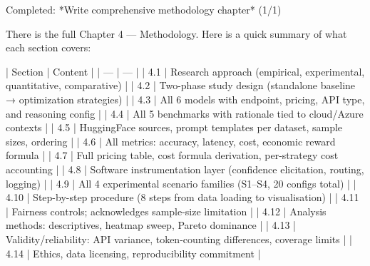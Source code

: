 Completed: *Write comprehensive methodology chapter* (1/1)

There is the full Chapter 4 — Methodology. Here is a quick summary of what each section covers:

| Section | Content |
| --- | --- |
| 4.1 | Research approach (empirical, experimental, quantitative, comparative) |
| 4.2 | Two-phase study design (standalone baseline → optimization strategies) |
| 4.3 | All 6 models with endpoint, pricing, API type, and reasoning config |
| 4.4 | All 5 benchmarks with rationale tied to cloud/Azure contexts |
| 4.5 | HuggingFace sources, prompt templates per dataset, sample sizes, ordering |
| 4.6 | All metrics: accuracy, latency, cost, economic reward formula |
| 4.7 | Full pricing table, cost formula derivation, per-strategy cost accounting |
| 4.8 | Software instrumentation layer (confidence elicitation, routing, logging) |
| 4.9 | All 4 experimental scenario families (S1–S4, 20 configs total) |
| 4.10 | Step-by-step procedure (8 steps from data loading to visualisation) |
| 4.11 | Fairness controls; acknowledges sample-size limitation |
| 4.12 | Analysis methods: descriptives, heatmap sweep, Pareto dominance |
| 4.13 | Validity/reliability: API variance, token-counting differences, coverage limits |
| 4.14 | Ethics, data licensing, reproducibility commitment |